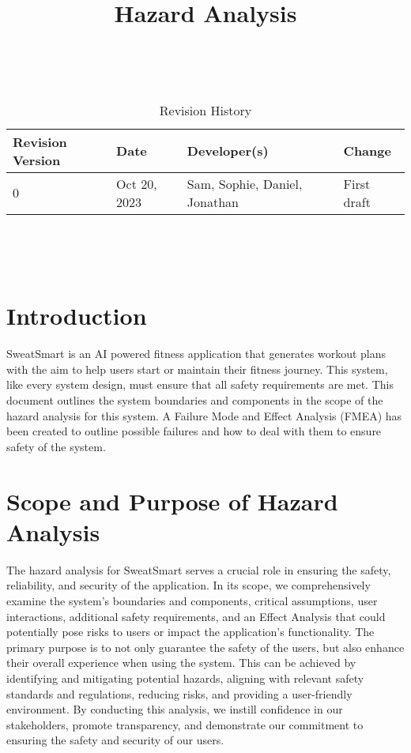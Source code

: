 \documentclass{article}
\title{Hazard Analysis\\\progname}
\author{\authname}
\date{}
\begin{document}
    \maketitle
    \thispagestyle{empty}

    ~\newpage


    \begin{table}[hp]
        \centering
        \caption{Revision History} \label{TblRevisionHistory}
        \begin{tabularx}{\textwidth}{lllX}
            \toprule
            \textbf{Revision Version} & \textbf{Date} & \textbf{Developer(s)} & \textbf{Change}\\
            \midrule
            0 & Oct 20, 2023 & Sam, Sophie, Daniel, Jonathan & First draft\\
            \bottomrule
        \end{tabularx}
    \end{table}

    ~\newpage

    \tableofcontents

    ~\newpage


    \section{Introduction}

    SweatSmart is an AI powered fitness application that generates workout plans with the aim to help users start or maintain their fitness journey. This system, like every system design, must ensure that all safety requirements are met. This document outlines the system boundaries and components in the scope of the hazard analysis for this system. A Failure Mode and Effect Analysis (FMEA) has been created to outline possible failures and how to deal with them to ensure safety of the system.

    \section{Scope and Purpose of Hazard Analysis}
    The hazard analysis for SweatSmart serves a crucial role in ensuring the safety, reliability, and security of the application. In its scope, we comprehensively examine the system's boundaries and components, critical assumptions, user interactions, additional safety requirements, and an Effect Analysis that could potentially pose risks to users or impact the application's functionality. The primary purpose is to not only guarantee the safety of the users, but also enhance their overall experience when using the system. This can be achieved by identifying and mitigating potential hazards, aligning with relevant safety standards and regulations, reducing risks, and providing a user-friendly environment. By conducting this analysis, we instill confidence in our stakeholders, promote transparency, and demonstrate our commitment to ensuring the safety and security of our users.
\end{document}
